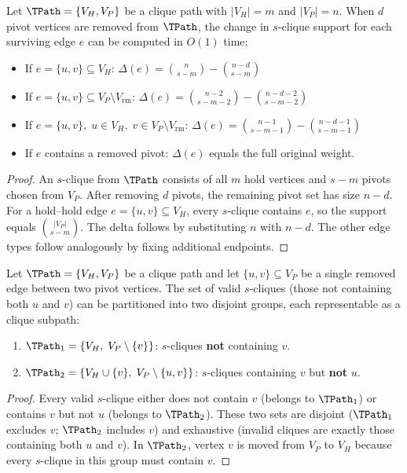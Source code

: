 \begin{lemma}
\label{lem:ncrDelta}
Let $\TPath = \{V_H, V_P\}$ be a clique path with $|V_H|=m$ and $|V_P|=n$.
When $d$ pivot vertices are removed from $\TPath$,
the change in $s$-clique support for each surviving edge $e$
can be computed in $O(1)$ time:
\begin{itemize}
    \item If $e = \{u, v\} \subseteq V_H$: \quad
        $\Delta(e) = \binom{n}{s{-}m} - \binom{n{-}d}{s{-}m}$
    \item If $e = \{u, v\} \subseteq V_P \setminus V_{\mathrm{rm}}$: \quad
        $\Delta(e) = \binom{n{-}2}{s{-}m{-}2} - \binom{n{-}d{-}2}{s{-}m{-}2}$
    \item If $e = \{u, v\},\; u \in V_H,\; v \in V_P \setminus V_{\mathrm{rm}}$: \quad
        $\Delta(e) = \binom{n{-}1}{s{-}m{-}1} - \binom{n{-}d{-}1}{s{-}m{-}1}$
    \item If $e$ contains a removed pivot: \quad
        $\Delta(e)$ equals the full original weight.
\end{itemize}
\end{lemma}

\begin{proof}
An $s$-clique from $\TPath$ consists of all $m$ hold vertices and $s{-}m$ pivots
chosen from $V_P$.
After removing $d$ pivots, the remaining pivot set has size $n{-}d$.
For a hold--hold edge $e = \{u,v\} \subseteq V_H$,
every $s$-clique contains $e$, so the support equals $\binom{|V_P|}{s{-}m}$.
The delta follows by substituting $n$ with $n{-}d$.
The other edge types follow analogously by fixing additional endpoints.
\end{proof}


\begin{lemma}
\label{lem:singleEdgeSplit}
Let $\TPath = \{V_H, V_P\}$ be a clique path and let $\{u, v\} \subseteq V_P$
be a single removed edge between two pivot vertices.
The set of valid $s$-cliques (those not containing both $u$ and $v$)
can be partitioned into two disjoint groups,
each representable as a clique subpath:
\begin{enumerate}
    \item $\TPath_1 = \{V_H,\; V_P \setminus \{v\}\}$: \quad
        $s$-cliques \textbf{not} containing $v$.
    \item $\TPath_2 = \{V_H \cup \{v\},\; V_P \setminus \{u, v\}\}$: \quad
        $s$-cliques containing $v$ but \textbf{not} $u$.
\end{enumerate}
\end{lemma}

\begin{proof}
Every valid $s$-clique either does not contain $v$ (belongs to $\TPath_1$)
or contains $v$ but not $u$ (belongs to $\TPath_2$).
These two sets are disjoint ($\TPath_1$ excludes $v$; $\TPath_2$ includes $v$)
and exhaustive (invalid cliques are exactly those containing both $u$ and $v$).
In $\TPath_2$, vertex $v$ is moved from $V_P$ to $V_H$
because every $s$-clique in this group must contain $v$.
\end{proof}
